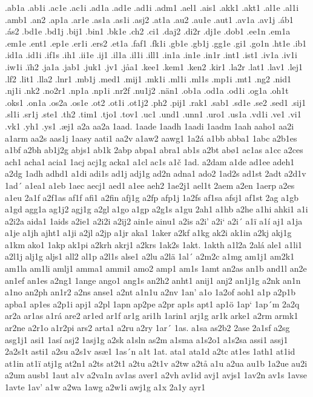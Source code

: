 .ab1a
.ab1i
.ac1e
.ac1i
.ad1a
.ad1e
.ad1i
.adm1
.ael1
.ais1
.akk1
.akt1
.al1e
.al1i
.amb1
.an2
.ap1a
.ar1e
.as1a
.as1i
.asj2
.at1a
.au2
.au1e
.aut1
.av1a
.av1j
.áb1
.ás2
.bd1e
.bd1j
.bij1
.bin1
.bk1e
.ch2
.ci1
.daj2
.di2r
.dj1e
.dob1
.ee1n
.em1a
.em1e
.ent1
.ep1e
.er1i
.ers2
.et1a
.faf1
.fk1i
.gb1e
.gb1j
.gg1e
.gi1
.go1n
.ht1e
.ib1
.id1a
.id1i
.if1s
.ih1
.ii1e
.ij1
.il1a
.il1i
.ill1
.in1a
.in1e
.in1r
.int1
.ist1
.iv1a
.iv1i
.iw1i
.ïh2
.ja1a
.jab1
.juk1
.jv1
.jåa1
.kee1
.kem1
.ken2
.kir1
.la2r
.lat1
.lav1
.lej1
.lf2
.lit1
.lla2
.lnr1
.mb1j
.med1
.mij1
.mk1i
.ml1i
.ml1s
.mp1i
.mt1
.ng2
.nid1
.nj1i
.nk2
.no2r1
.np1a
.np1i
.nr2f
.nu1j2
.nän1
.ob1a
.od1a
.od1i
.og1a
.oh1t
.oks1
.on1a
.os2a
.os1e
.ot2
.ot1i
.ot1j2
.ph2
.pij1
.rak1
.sab1
.sd1e
.se2
.sed1
.sij1
.sl1i
.sr1j
.ste1
.th2
.tim1
.tjo1
.tov1
.uc1
.und1
.unn1
.uro1
.us1a
.vd1i
.ve1
.vi1
.vk1
.yh1
.ys1
.æj1
a2a
aa2a
1aad.
1aade
1aadh
1aadi
1aadm
1aah
aaho1
aa2i
a1arm
aa2s
aas1j
1aasy
aati1
aa2v
a1aw2
aawg1
1a2á
a1bb
abba1
1abc
a2b1es
a1bf
a2bh
ab1j2g
abjs1
ab1k
2abp
abpa1
abra1
ab1s
a2bt
abø1
ac1as
a1cc
a2ces
ach1
acha1
acia1
1acj
acj1g
acka1
a1cl
ac1s
a1č
1ad.
a2dam
a1de
ad1ee
adeh1
a2dg
1adh
adhd1
a1di
adi1s
ad1j
adj1g
ad2n
adna1
ado2
1ad2s
ad1st
2adt
a2d1v
1ad´
a1ea1
a1eb
1aec
aecj1
aed1
a1ee
aeh2
1ae2j1
ael1t
2aem
a2en
1aerp
a2es
a1eu
2a1f
a2f1as
af1f
afi1
a2fin
afj1g
a2fp
afp1j
1a2fs
af1sa
afsj1
af1st
2ag
a1gb
a1gd
agg1a
ag1j2
agj1g
a2gl
a1go
a1gp
a2g1s
a1gu
2ah1
a1hb
a2he
a1hi
ahki1
a1i
a2i2a
aida1
1aids
a2ie1
a2i2i
a2ij2
ain1e
ainu1
a2is
a2i'
a2i`
a2i´
a1ï
a1í
aj1
a1ja
a1je
a1jh
ajht1
a1ji
a2jl
a2jp
a1jr
aka1
1aker
a2kf
a1kg
ak2i
ak1in
a2kj
akj1g
a1km
ako1
1akp
ak1pi
a2krh
akrj1
a2krs
1ak2s
1akt.
1akth
a1l2a
2alá
ale1
a1li1
a2l1j
alj1g
aljs1
all2
al1p
a2l1s
alse1
a2lu
a2lä
1al´
a2m2c
a1mg
am1j1
am2k1
am1la
am1li
amlj1
amma1
ammi1
amo2
amp1
am1s
1amt
an2as
an1b
and1l
an2e
an1ef
an1es
a2ng1
1ange
ango1
ang1s
an2h2
anht1
anij1
anj2
an1j1g
a2nk
an1n
a1no
an2ph
an1r2
a2ns
anse1
a2nt
a1n1u
a2nv
1an'
a1o
1a2of
aoh1
a1p
a2p1b
apba1
ap1es
a2p1i
apj1
a2pl
1apn
ap2pe
a2pr
ap1s
apt1
ap1ö
1ap`
1ap´m
2a2q
ar2a
ar1as
a1rá
are2
ar1ed
ar1f
ar1g
ari1h
1arin1
arj1g
ar1k
arke1
a2rm
armk1
ar2ne
a2r1o
a1r2pi
ars2
arta1
a2ru
a2ry
1ar´
1as.
a1sa
as2b2
2ase
2a1sf
a2sg
asg1j1
asi1
1así
asj2
1asj1g
a2sk
a1sln
as2m
a1sma
a1s2o1
a1s2sa
assi1
assj1
2a2s1t
asti1
a2su
a2s1v
asæ1
1as´n
a1t
1at.
ata1
ata1d
a2tc
at1es
1ath1
at1id
at1in
at1ï
atj1g
at2n1
a2ts
at2t1
a2tu
a2t1v
a2tw
a2tå
a1u
a2ua
au1b
1a2ue
au2i
a2um
ausb1
1aut
a1v
a2va1n
av1as
aver1
a2vh
av1id
avj1
avjs1
1av2n
av1s
1avse
1avte
1av'
a1w
a2wa
1awg
a2w1i
awj1g
a1x
2a1y
ayr1
